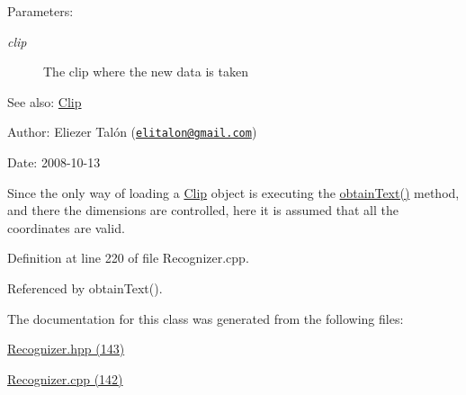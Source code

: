 \begin{Desc}
\item[Parameters:]
\begin{description}
\item[{\em clip}]The clip where the new data is taken\end{description}
\end{Desc}
\begin{Desc}
\item[See also:]\hyperlink{class_clip}{Clip}\end{Desc}
\begin{Desc}
\item[Author:]Eliezer Talón (\href{mailto:elitalon@gmail.com}{\tt elitalon@gmail.com}) \end{Desc}
\begin{Desc}
\item[Date:]2008-10-13\end{Desc}
Since the only way of loading a \hyperlink{class_clip}{Clip} object is executing the \hyperlink{class_recognizer_008a0ea69a912ff54882dd20d18adcf9}{obtainText()} method, and there the dimensions are controlled, here it is assumed that all the coordinates are valid. 

Definition at line 220 of file Recognizer.cpp.

Referenced by obtainText().

The documentation for this class was generated from the following files:\begin{CompactItemize}
\item 
\hyperlink{_recognizer_8hpp}{Recognizer.hpp (143)}\item 
\hyperlink{_recognizer_8cpp}{Recognizer.cpp (142)}\end{CompactItemize}
